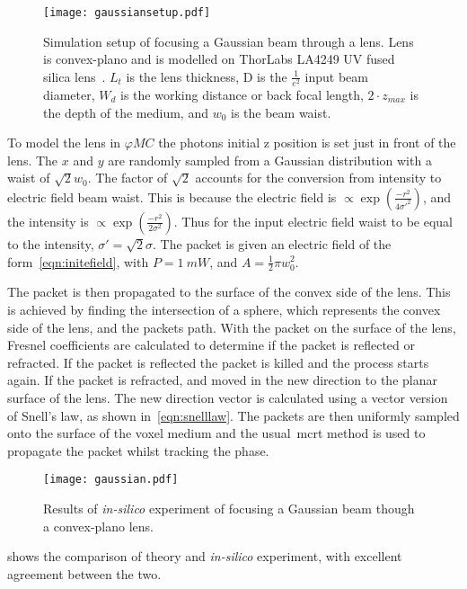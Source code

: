 \begin{figure}[!ht]
    \centering
    \texttt{[image: gaussiansetup.pdf]}
    \caption{Simulation setup of focusing a Gaussian beam through a lens. Lens is convex-plano and is modelled on ThorLabs LA4249 UV fused silica lens~\cite{thorlens}.  $L_t$ is the lens thickness, D is the $\tfrac{1}{e^2}$ input beam diameter, $W_d$ is the working distance or back focal length, $2 \cdot z_{max}$ is the depth of the medium, and $w_0$ is the beam waist.}
    \label{fig:gausssetup}
\end{figure}

To model the lens in $\varphi MC$ the photons initial z position is set just in front of the lens.
The $x$ and $y$ are randomly sampled from a Gaussian distribution with a waist of $\sqrt{2}w_0$.
The factor of $\sqrt{2}$ accounts for the conversion from intensity to electric field beam waist.
This is because the electric field is $\propto \exp{\left(\tfrac{-r^2}{4\sigma'^2}\right)}$, and the intensity is $\propto \exp{\left(\tfrac{-r^2}{2\sigma^2}\right)}$.
Thus for the input electric field waist to be equal to the intensity,  $\sigma'=\sqrt{2}\sigma$.
The packet is given an electric field of the form~\cref{eqn:initefield}, with $P=1~mW$, and $A=\tfrac{1}{2}\pi w_0^2$.

The packet is then propagated to the surface of the convex side of the lens.
This is achieved by finding the intersection of a sphere, which represents the convex side of the lens, and the packets path.
With the packet on the surface of the lens, Fresnel coefficients are calculated to determine if the packet is reflected or refracted.
If the packet is reflected the packet is killed and the process starts again.
If the packet is refracted, and moved in the new direction to the planar surface of the lens.
The new direction vector is calculated using a vector version of Snell's law, as shown in~\cref{eqn:snelllaw}.
The packets are then uniformly sampled onto the surface of the voxel medium and the usual~\gls*{mcrt} method is used to propagate the packet whilst tracking the phase.

\begin{figure}[!htpb]
    \centering
    \texttt{[image: gaussian.pdf]}
    \caption{Results of \textit{in-silico} experiment of focusing a Gaussian beam though a convex-plano lens.}
    \label{fig:simgaussexp}
\end{figure}


 shows the comparison of theory and \textit{in-silico} experiment, with excellent agreement between the two.

